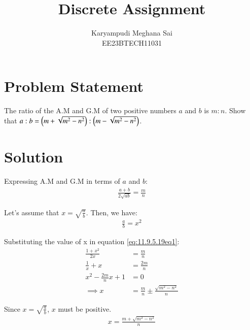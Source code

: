 \documentclass[journal,12pt,onecolumn]{IEEEtran}
\theoremstyle{remark}
\begin{document}
\let\vec\mathbf







\bigskip

\renewcommand{\thefigure}{\theenumi}
\renewcommand{\thetable}{\theenumi}


\title{Discrete Assignment}
\author{Karyampudi Meghana Sai\\ EE23BTECH11031}
\maketitle

\section*{Problem Statement}

The ratio of the A.M and G.M of two positive numbers $a$ and $b$ is $m:n$. Show that $a:b = \left( m + \sqrt{m^2 - n^2}\right) : \left( m - \sqrt{m^2 - n^2}\right)$.
\section*{Solution}

Expressing A.M and G.M in terms of $a$ and $b$:
\begin{align}
\frac{a + b}{2\sqrt{ab}} = \frac{m}{n} \label{eq:11.9.5.19eq1}
\end{align}

Let's assume that $x = \sqrt{\frac{a}{b}}$. Then, we have:
\begin{align}
\frac{a}{b} = x^2 \label{eq:11.9.5.19eq2}
\end{align}

Substituting the value of x in equation \eqref{eq:11.9.5.19eq1}:
\begin{align}
\frac{1 + x^2}{2x} &= \frac{m}{n}\label{eq:11.9.5.19eq3} \\
\frac{1}{x} + x &= \frac{2m}{n} \label{eq:11.9.5.19eq4} \\
x^2 - \frac{2m}{n}x + 1 &=  0 \label{eq:11.9.5.19eq5}\\
\implies x &= \frac{m}{n} \pm \frac{\sqrt{m^2 - n^2}}{n} \label{eq:11.9.5.19eq6}
\end{align}

Since $x = \sqrt{\frac{a}{b}}$, $x$ must be positive.
\begin{align}
x = \frac{m + \sqrt{m^2 - n^2}}{n}\label{eq:11.9.5.19eq7}
\end{align}
\end{document}
